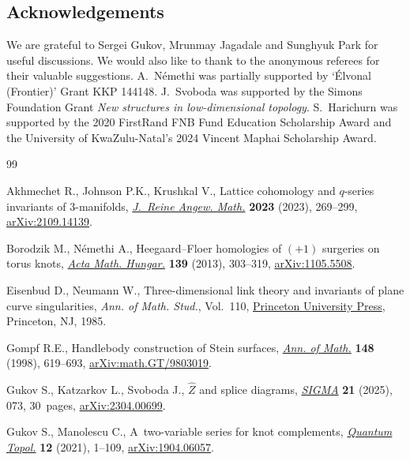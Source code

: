 \documentclass[pdftex]{sigma}
\begin{document}
\subsection*{Acknowledgements}

We are grateful to Sergei Gukov, Mrunmay Jagadale and Sunghyuk Park for useful discussions. We would also like to thank to the anonymous referees for their valuable suggestions. A.~N\'emethi was partially supported by `\'Elvonal (Frontier)' Grant KKP 144148. J.~Svoboda was supported by the Simons Foundation Grant {\it New structures in low-dimensional topology}. S.~Harichurn was supported by the 2020 FirstRand FNB Fund Education Scholarship Award and the University of KwaZulu-Natal's 2024 Vincent Maphai Scholarship Award.

\begin{thebibliography}{99}
\footnotesize\itemsep=0pt

Akhmechet R., Johnson P.K., Krushkal V., Lattice cohomology and {$q$}-series
 invariants of 3-manifolds,
 \href{https://doi.org/10.1515/crelle-2022-0096}{\textit{J.~Reine Angew.
 Math.}} \textbf{2023} (2023), 269--299,
 \href{http://arxiv.org/abs/2109.14139}{arXiv:2109.14139}.

Borodzik M., N\'emethi A., Heegaard--{F}loer homologies of {$(+1)$} surgeries
 on torus knots, \href{https://doi.org/10.1007/s10474-012-0280-x}{\textit{Acta
 Math. Hungar.}} \textbf{139} (2013), 303--319,
 \href{http://arxiv.org/abs/1105.5508}{arXiv:1105.5508}.

Eisenbud D., Neumann W., Three-dimensional link theory and invariants of plane
 curve singularities, \textit{Ann. of Math. Stud.}, Vol.~110,
 \href{https://doi.org/10.1515/9781400881925}{Princeton University Press},
 Princeton, NJ, 1985.

Gompf R.E., Handlebody construction of {S}tein surfaces,
 \href{https://doi.org/10.2307/121005}{\textit{Ann. of Math.}} \textbf{148}
 (1998), 619--693,
 \href{http://arxiv.org/abs/math.GT/9803019}{arXiv:math.GT/9803019}.

Gukov S., Katzarkov L., Svoboda J., {$\widehat{Z}$} and splice diagrams,
 \href{https://doi.org/10.3842/SIGMA.2025.073}{\textit{SIGMA}} \textbf{21}
 (2025), 073, 30~pages,
 \href{http://arxiv.org/abs/2304.00699}{arXiv:2304.00699}.

Gukov S., Manolescu C., A~two-variable series for knot complements,
 \href{https://doi.org/10.4171/qt/145}{\textit{Quantum Topol.}} \textbf{12}
 (2021), 1--109, \href{http://arxiv.org/abs/1904.06057}{arXiv:1904.06057}.


\end{thebibliography}
\end{document}
